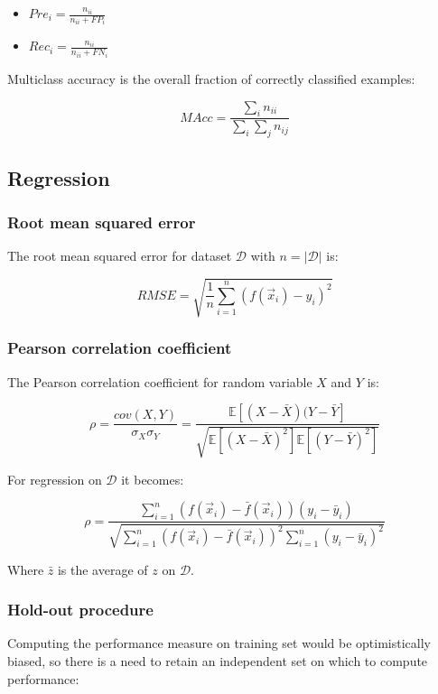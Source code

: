 		\begin{multicols}{2}
			\begin{itemize}
				\item $Pre_i = \frac{n_{ii}}{n_{ii} + FP_i}$
				\item $Rec_i = \frac{n_{ii}}{n_{ii}+FN_i}$
			\end{itemize}
		\end{multicols}

		Multiclass accuracy is the overall fraction of correctly classified examples:

		$$MAcc = \frac{\sum\limits_i n_{ii}}{\sum\limits_i\sum\limits_j n_{ij}}$$

	\subsection{Regression}

		\subsubsection{Root mean squared error}
		The root mean squared error for dataset $\mathcal{D}$ with $n = |\mathcal{D}|$ is:

		$$RMSE = \sqrt{\frac{1}{n}\sum\limits_{i=1}^n(f(\vec{x}_i)-y_i)^2}$$

		\subsubsection{Pearson correlation coefficient}
		The Pearson correlation coefficient for random variable $X$ and $Y$ is:

		$$\rho = \frac{cov(X, Y)}{\sigma_X\sigma_Y} = \frac{\mathbb{E}[(X-\bar{X})(Y-\bar{Y}]}{\sqrt{\mathbb{E}[(X-\bar{X})^2]\mathbb{E}[(Y-\bar{Y})^2]}}$$

		For regression on $\mathcal{D}$ it becomes:

		$$\rho = \frac{\sum\limits_{i=1}^n(f(\vec{x}_i)-\bar{f}(\vec{x}_i))(y_i-\bar{y}_i)}{\sqrt{\sum\limits_{i=1}^n(f(\vec{x}_i)-\bar{f}(\vec{x}_i))^2\sum\limits_{i=1}^n(y_i-\bar{y}_i)^2}}$$

		Where $\bar{z}$ is the average of $z$ on $\mathcal{D}$.

		\subsubsection{Hold-out procedure}
		Computing the performance measure on training set would be optimistically biased, so there is a need to retain an independent set on which to compute performance:

